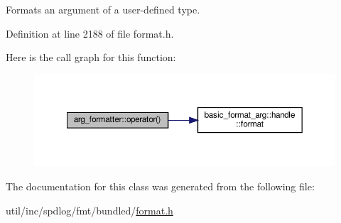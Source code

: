 Formats an argument of a user-\/defined type. 

Definition at line 2188 of file format.\+h.

Here is the call graph for this function\+:
\nopagebreak
\begin{figure}[H]
\begin{center}
\leavevmode
\includegraphics[width=350pt]{classarg__formatter_ac8ddd9b78934fc951916a30d46114ab1_cgraph}
\end{center}
\end{figure}


The documentation for this class was generated from the following file\+:\begin{DoxyCompactItemize}
\item 
util/inc/spdlog/fmt/bundled/\hyperlink{format_8h}{format.\+h}\end{DoxyCompactItemize}
